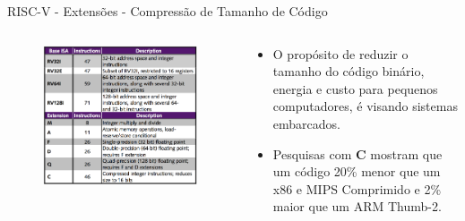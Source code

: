 \documentclass[aspectratio=169]{beamer}
\begin{document}
\begin{frame}{RISC-V - Extensões - Compressão de Tamanho de Código}
	\begin{columns}
		\begin{column}{0.58\textwidth}
			\begin{figure}
				\centering
				\label{fig:bi2}
				\includegraphics[width=1\textwidth]{img/base-instruction.png}
			\end{figure}
		\end{column}
		\begin{column}{0.55\textwidth}
			\begin{itemize}
				\item O propósito de reduzir o tamanho do código binário, energia e custo para pequenos computadores, é visando sistemas embarcados.

				\item Pesquisas com \textbf{C} mostram que um código 20\% menor que um x86 e MIPS Comprimido e 2\% maior que um ARM Thumb-2.
			\end{itemize}
		\end{column}
	\end{columns}
\end{frame}
\end{document}
